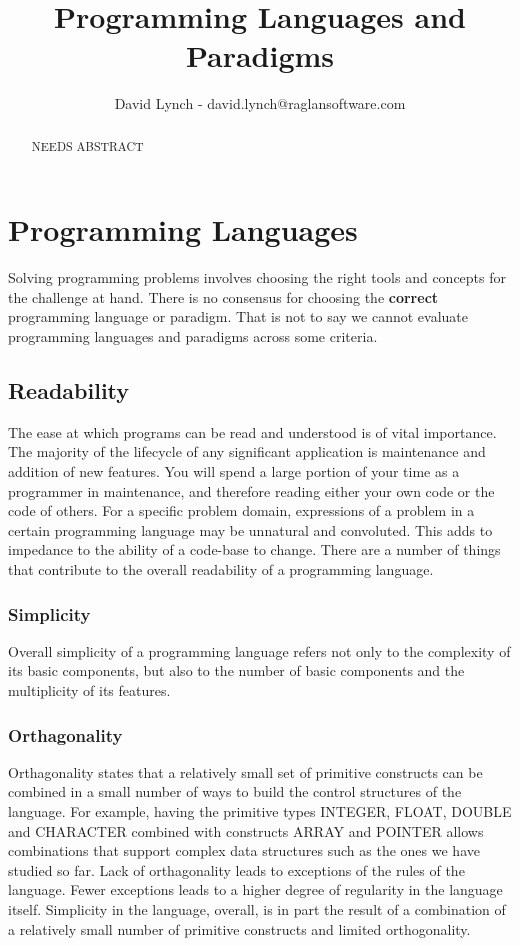\documentclass[10pt,a4paper]{article}
\title{Programming Languages and Paradigms}
\author{David Lynch - david.lynch@raglansoftware.com }
\begin{document}
\maketitle
\begin{abstract}
NEEDS ABSTRACT
\end{abstract}
\section{Programming Languages}
Solving programming problems involves choosing the right tools and concepts for the challenge at hand. There is no consensus for choosing the {\bf correct} programming language or paradigm. That is not to say we cannot evaluate programming languages and paradigms across some criteria. 
\subsection{Readability}
The ease at which programs can be read and understood is of vital importance. The majority of the lifecycle of any significant application is maintenance and addition of new features. You will spend a large portion of your time as a programmer in maintenance, and therefore reading either your own code or the code of others. For a specific problem domain, expressions of a problem in a certain programming language may be unnatural and convoluted. This adds to impedance to the ability of a code-base to change. There are a number of things that contribute to the overall readability of a programming language. 
\subsubsection{Simplicity}
Overall simplicity of a programming language refers not only to the complexity of its basic components, but also to the number of basic components and the multiplicity of its features. 
\subsubsection{Orthagonality}
Orthagonality states that a relatively small set of primitive constructs can be combined in a small number of ways to build the control structures of the language. For example, having the primitive types INTEGER, FLOAT, DOUBLE and CHARACTER combined with constructs ARRAY and POINTER allows combinations that support complex data structures such as the ones we have studied so far. Lack of orthagonality leads to exceptions of the rules of the language. Fewer exceptions leads to a higher degree of regularity in the language itself. Simplicity in the language, overall, is in part the result of a combination of a relatively small number of primitive constructs and limited orthogonality. 
\end{document}
